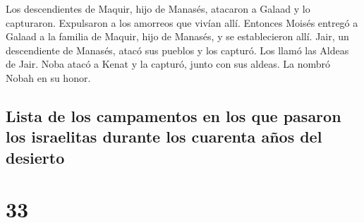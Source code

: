  Los descendientes de Maquir, hijo de Manasés, atacaron a
Galaad y lo capturaron. Expulsaron a los amorreos que vivían allí.
 Entonces Moisés entregó a Galaad a la familia de Maquir,
hijo de Manasés, y se establecieron allí.  Jair, un
descendiente de Manasés, atacó sus pueblos y los capturó. Los llamó las
Aldeas de Jair.  Noba atacó a Kenat y la capturó, junto
con sus aldeas. La nombró Nobah en su honor.

\hypertarget{lista-de-los-campamentos-en-los-que-pasaron-los-israelitas-durante-los-cuarenta-auxf1os-del-desierto}{%
\subsection{Lista de los campamentos en los que pasaron los israelitas
durante los cuarenta años del
desierto}\label{lista-de-los-campamentos-en-los-que-pasaron-los-israelitas-durante-los-cuarenta-auxf1os-del-desierto}}

\hypertarget{section-32}{%
\section{33}\label{section-32}}

